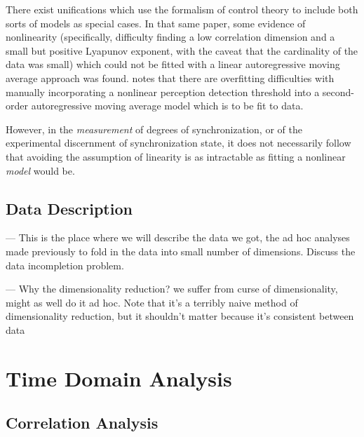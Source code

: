 \documentclass[12pt]{article}
\begin{document}
There exist unifications \cite{pressing} which use the formalism of control theory to include both sorts of models as special cases. In that same paper, some evidence of nonlinearity (specifically, difficulty finding a low correlation dimension and a small but positive Lyapunov exponent, with the caveat that the cardinality of the data was small) which could not be fitted with a linear autoregressive moving average approach was found. \cite{schulze} notes that there are overfitting difficulties with manually incorporating a nonlinear perception detection threshold into a second-order autoregressive moving average model which is to be fit to data.

However, in the \emph{measurement} of degrees of synchronization, or of the experimental discernment of synchronization state, it does not necessarily follow that avoiding the assumption of linearity is as intractable as fitting a nonlinear \emph{model} would be.

\subsection{Data Description}

--- This is the place where we will describe the data we got, the ad hoc analyses made previously to fold in the data into small number of dimensions. Discuss the data incompletion problem.

--- Why the dimensionality reduction? we suffer from curse of dimensionality, might as well do it ad hoc. Note that it's a terribly naive method of dimensionality reduction, but it shouldn't matter because it's consistent between data

\section{Time Domain Analysis}

\subsection{Correlation Analysis}

\end{document}

